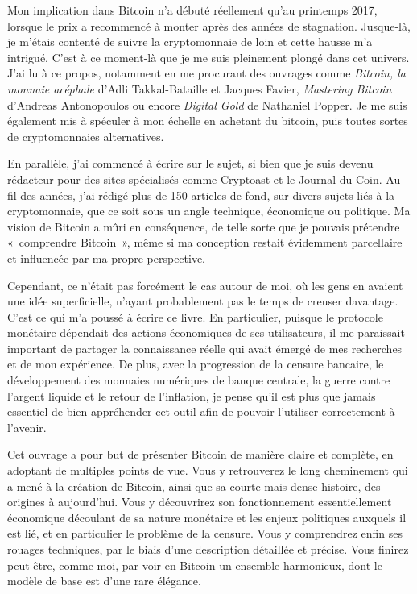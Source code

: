 Mon implication dans Bitcoin n'a débuté réellement qu'au printemps 2017, lorsque le prix a recommencé à monter après des années de stagnation. Jusque-là, je m'étais contenté de suivre la cryptomonnaie de loin et cette hausse m'a intrigué. C'est à ce moment-là que je me suis pleinement plongé dans cet univers. J'ai lu à ce propos, notamment en me procurant des ouvrages comme \emph{Bitcoin, la monnaie acéphale} d'Adli Takkal-Bataille et Jacques Favier, \emph{Mastering Bitcoin} d'Andreas Antonopoulos ou encore \emph{Digital Gold} de Nathaniel Popper. Je me suis également mis à spéculer à mon échelle en achetant du bitcoin, puis toutes sortes de cryptomonnaies alternatives.

En parallèle, j'ai commencé à écrire sur le sujet, si bien que je suis devenu rédacteur pour des sites spécialisés comme Cryptoast et le Journal du Coin. Au fil des années, j'ai rédigé plus de 150 articles de fond, sur divers sujets liés à la cryptomonnaie, que ce soit sous un angle technique, économique ou politique. Ma vision de Bitcoin a mûri en conséquence, de telle sorte que je pouvais prétendre «~comprendre Bitcoin~», même si ma conception restait évidemment parcellaire et influencée par ma propre perspective.

Cependant, ce n'était pas forcément le cas autour de moi, où les gens en avaient une idée superficielle, n'ayant probablement pas le temps de creuser davantage. C'est ce qui m'a poussé à écrire ce livre. En particulier, puisque le protocole monétaire dépendait des actions économiques de ses utilisateurs, il me paraissait important de partager la connaissance réelle qui avait émergé de mes recherches et de mon expérience. De plus, avec la progression de la censure bancaire, le développement des monnaies numériques de banque centrale, la guerre contre l'argent liquide et le retour de l'inflation, je pense qu'il est plus que jamais essentiel de bien appréhender cet outil afin de pouvoir l'utiliser correctement à l'avenir.

Cet ouvrage a pour but de présenter Bitcoin de manière claire et complète, en adoptant de multiples points de vue. Vous y retrouverez le long cheminement qui a mené à la création de Bitcoin, ainsi que sa courte mais dense histoire, des origines à aujourd'hui. Vous y découvrirez son fonctionnement essentiellement économique découlant de sa nature monétaire et les enjeux politiques auxquels il est lié, et en particulier le problème de la censure. Vous y comprendrez enfin ses rouages techniques, par le biais d'une description détaillée et précise. Vous finirez peut-être, comme moi, par voir en Bitcoin un ensemble harmonieux, dont le modèle de base est d'une rare élégance.

